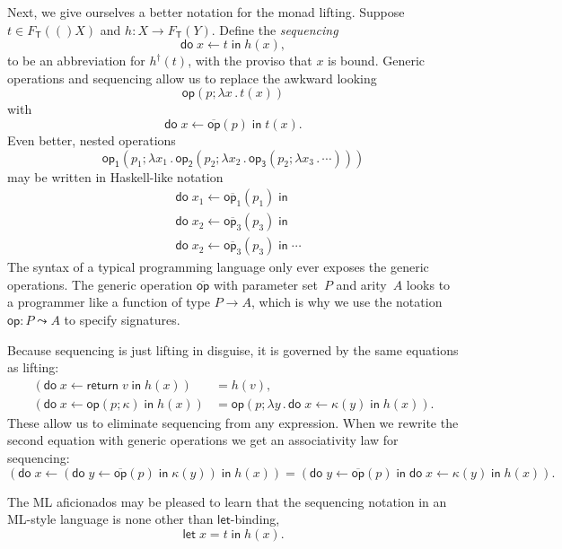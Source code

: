 \documentclass{amsart}
\newcommand{\theory}[1]{\mathsf{#1}} %
\newcommand{\Free}[2]{F_{\theory{#1}}(#2)} %
\newcommand{\lam}[1]{\lambda #1 \,.\,}
\newcommand{\opdecl}[3]{#1 : #2 \leadsto #3} %
\newcommand{\lift}[1]{#1^\dagger} %
\newcommand{\kode}[1]{\mathsf{#1}}
\newcommand{\seq}[2]{\kode{do}\; #1 \leftarrow #2 \;\kode{in}\;}
\newcommand{\xopgen}[2]{\overline{#1}(#2)}
\newcommand{\opgen}[2]{\xopgen{\kode{#1}}{#2}}
\newcommand{\opcall}[3]{\kode{#1}(#2; #3)}
\newcommand{\return}[1]{\kode{return}\;#1}
\begin{document}
Next, we give ourselves a better notation for the monad lifting. Suppose
$t \in \Free{T}(X)$ and $h : X \to \Free{T}{Y}$. Define the \emph{sequencing}
%
\begin{equation*}
  \seq{x}{t} h(x),
\end{equation*}
%
to be an abbreviation for $\lift{h}(t)$, with the proviso that $x$ is bound.
Generic operations and sequencing allow us to replace the awkward looking
%
\begin{equation*}
  \opcall{op}{p}{\lam{x} t(x)}
\end{equation*}
%
with
%
\begin{equation*}
  \seq{x}{\opgen{op}{p}} t(x).
\end{equation*}
%
Even better, nested operations
%
\begin{equation*}
  \opcall{op_1}{p_1}{\lam{x_1}
  \opcall{op_2}{p_2}{\lam{x_2}
  \opcall{op_3}{p_2}{\lam{x_3}
  \cdots
  }}}
\end{equation*}
%
may be written in Haskell-like notation
%
\begin{align*}
  &\seq{x_1}{\xopgen{\kode{op}_1}{p_1}} \\
  &\seq{x_2}{\xopgen{\kode{op}_3}{p_3}} \\
  &\seq{x_2}{\xopgen{\kode{op}_3}{p_3}}
  \cdots
\end{align*}
%
The syntax of a typical programming language only ever exposes the generic
operations. The generic operation $\overline{\kode{op}}$ with parameter set~$P$
and arity~$A$ looks to a programmer like a function of type $P \to A$, which is
why we use the notation $\opdecl{\kode{op}}{P}{A}$ to specify signatures.

Because sequencing is just lifting in disguise, it is governed by the same
equations as lifting:
%
\begin{align*}
  (\seq{x}{\return{v}} h(x)) &= h(v), \\
  (\seq{x}{\opcall{op}{p}{\kappa}} h(x)) &=
  \opcall{op}{p}{\lam{y} \seq{x}{\kappa(y)} h(x)}.
\end{align*}
%
These allow us to eliminate sequencing from any expression. When we rewrite the
second equation with generic operations we get an associativity law for
sequencing:
%
\begin{equation*}
  (\seq{x}{(\seq{y}{\opgen{op}{p}} \kappa(y))} h(x)) =
  (\seq{y}{\opgen{op}{p}} \seq{x}{\kappa(y)} h(x)).
\end{equation*}

The ML aficionados may be pleased to learn that the sequencing notation in
an ML-style language is none other than $\kode{let}$-binding,
%
\begin{equation*}
  \kode{let}\; x = t\;\kode{in}\;h(x).
\end{equation*}
\end{document}
